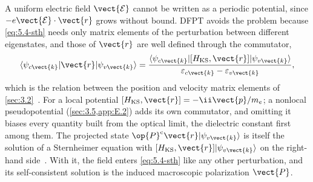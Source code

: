 A uniform electric field $\vect{\mathcal{E}}$ cannot be written as a periodic potential, since $-e\vect{\mathcal{E}}\cdot\vect{r}$ grows without bound. DFPT avoids the problem because \cref{eq:5.4-sth} needs only matrix elements of the perturbation between different eigenstates, and those of $\vect{r}$ are well defined through the commutator,
\begin{equation}
  \langle\psi_{c\vect{k}}|\vect{r}|\psi_{v\vect{k}}\rangle = \frac{\langle\psi_{c\vect{k}}|[H_{\mathrm{KS}},\vect{r}]|\psi_{v\vect{k}}\rangle}{\varepsilon_{c\vect{k}} - \varepsilon_{v\vect{k}}} ,
  \label{eq:E.4-rcomm}
\end{equation}
which is the relation between the position and velocity matrix elements of \cref{sec:3.2}~\cite[Eq.~(37)]{baroni2001phonons}. For a local potential $[H_{\mathrm{KS}},\vect{r}] = -\ii\vect{p}/m_e$; a nonlocal pseudopotential (\cref{sec:3.5,app:E.2}) adds its own commutator, and omitting it biases every quantity built from the optical limit, the dielectric constant first among them. The projected state $\op{P}^{\mathrm{c}}\vect{r}|\psi_{v\vect{k}}\rangle$ is itself the solution of a Sternheimer equation with $[H_{\mathrm{KS}},\vect{r}]|\psi_{v\vect{k}}\rangle$ on the right-hand side~\cite[Eq.~(44)]{baroni2001phonons}. With it, the field enters \cref{eq:5.4-sth} like any other perturbation, and its self-consistent solution is the induced macroscopic polarization $\vect{P}$.

